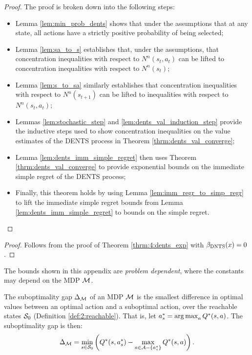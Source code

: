     \thrmDENTSexp*
    \begin{proof}
        The proof is broken down into the following steps:
        \begin{itemize}
            \item Lemma \ref{lem:min_prob_dents} shows that under the assumptions that at any state, all actions have a strictly positive probability of being selected;
            \item Lemma \ref{lem:sa_to_s} establishes that, under the assumptions, that concentration inequalities with respect to $N^n(s_t,a_t)$ can be lifted to concentration inequalities with respect to $N^n(s_t)$;
            \item Lemma \ref{lem:s_to_sa} similarly establishes that concentration inequalities with respect to $N^n(s_{t+1})$ can be lifted to inequalities with respect to $N^n(s_t,a_t)$;
            \item Lemmas \ref{lem:stochastic_step} and \ref{lem:dents_val_induction_step} provide the inductive steps used to show concentration inequalities on the value estimates of the DENTS process in Theorem \ref{thrm:dents_val_converge};
            \item Lemma \ref{lem:dents_imm_simple_regret} then uses Theorem \ref{thrm:dents_val_converge} to provide exponential bounds on the immediate simple regret of the DENTS process;
            \item Finally, this theorem holds by using Lemma \ref{lem:imm_regr_to_simp_regr} to lift the immediate simple regret bounds from Lemma \ref{lem:dents_imm_simple_regret} to bounds on the simple regret.
        \end{itemize}
    \end{proof}



    \thrmBTSexp*
    \begin{proof}
        Follows from the proof of Theorem \ref{thrm:4:dents_exp} with ${\beta_{{\textnormal{DNTS}}}}(x)=0$. 
    \end{proof}


    The bounds shown in this appendix are \textit{problem dependent}, where the constants may depend on the MDP $\mathcal{M}$.

    \begin{defn}
        \label{def:subopt_gap}
        The \textnormal{suboptimality gap} $\Delta_{\mathcal{M}}$ of an MDP $\mathcal{M}$ is the smallest difference in optimal values between an optimal action and a suboptimal action, over the reachable states $\mathcal{S}_0$ (Definition \ref{def:2:reachable}). That is, let $a^*_s = \operatorname*{arg\,max}_a Q^*(s,a)$. The suboptimality gap is then:
        \begin{align}
            \Delta_{\mathcal{M}} = \min_{s\in\mathcal{S}_0} \left( Q^*(s,a^*_s) - \max_{a\in\mathcal{A}-\{a^*_s\}} Q^*(s,a) \right).
        \end{align}
    \end{defn}






